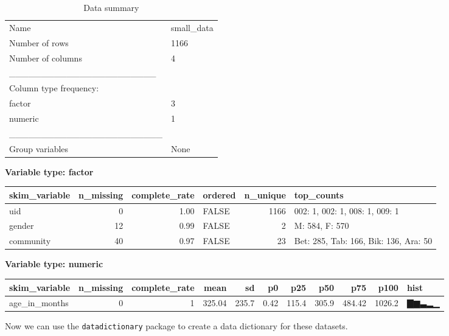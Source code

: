 \documentclass[]{article}
\begin{document}
\begin{longtable}[]{@{}ll@{}}
\caption{Data summary}\tabularnewline
\toprule
\endhead
Name & small\_data\tabularnewline
Number of rows & 1166\tabularnewline
Number of columns & 4\tabularnewline
\_\_\_\_\_\_\_\_\_\_\_\_\_\_\_\_\_\_\_\_\_\_\_ &\tabularnewline
Column type frequency: &\tabularnewline
factor & 3\tabularnewline
numeric & 1\tabularnewline
\_\_\_\_\_\_\_\_\_\_\_\_\_\_\_\_\_\_\_\_\_\_\_\_ &\tabularnewline
Group variables & None\tabularnewline
\bottomrule
\end{longtable}

\textbf{Variable type: factor}

\begin{longtable}[]{@{}lrrlrl@{}}
\toprule
skim\_variable & n\_missing & complete\_rate & ordered & n\_unique &
top\_counts\tabularnewline
\midrule
\endhead
uid & 0 & 1.00 & FALSE & 1166 & 002: 1, 002: 1, 008: 1, 009:
1\tabularnewline
gender & 12 & 0.99 & FALSE & 2 & M: 584, F: 570\tabularnewline
community & 40 & 0.97 & FALSE & 23 & Bet: 285, Tab: 166, Bik: 136, Ara:
50\tabularnewline
\bottomrule
\end{longtable}

\textbf{Variable type: numeric}

\begin{longtable}[]{@{}lrrrrrrrrrl@{}}
\toprule
skim\_variable & n\_missing & complete\_rate & mean & sd & p0 & p25 &
p50 & p75 & p100 & hist\tabularnewline
\midrule
\endhead
age\_in\_months & 0 & 1 & 325.04 & 235.7 & 0.42 & 115.4 & 305.9 & 484.42
& 1026.2 & ▇▆▃▂▁\tabularnewline
\bottomrule
\end{longtable}

Now we can use the \texttt{datadictionary} package to create a data
dictionary for these datasets.
\end{document}
